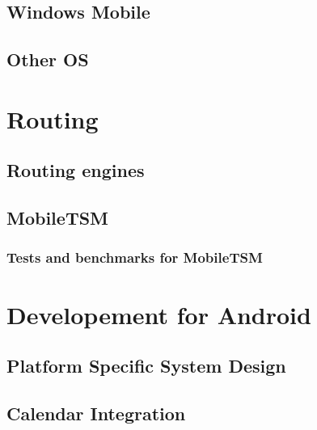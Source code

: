 \documentclass[11pt,a4paper]{scrreprt}
\begin{document}
\section{Windows Mobile} %
\label{sec:win_mobile}


\section{Other OS} %
\label{sec:other_os}




\chapter{Routing} %
\label{sec:android_routing}


\section{Routing engines}
\label{sub:routing_engines}


\section{MobileTSM} %
\label{sub:routing_mobiletsm}


\subsection{Tests and benchmarks for MobileTSM}
\label{sub:routing_testcase}




\chapter{Developement for Android} %
\label{chp:android}
%

\section{Platform Specific System Design} %
\label{sec:android_desing}


\section{Calendar Integration} %
\label{sec:android_calendar}

\end{document}
